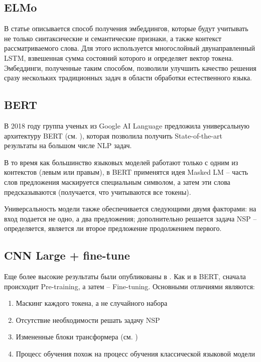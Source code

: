 \documentclass[a4paper,14pt]{extarticle}
\begin{document}
\clearpage

\subsection{ELMo}

В статье \cite{1802.05365} описывается способ получения эмбеддингов, которые будут учитывать не только синтаксические и семантические признаки, а также контекст рассматриваемого слова. Для этого используется многослойный двунаправленный LSTM, взвешенная сумма состояний которого и определяет вектор токена. Эмбеддинги, полученные таким способом, позволили улучшить качество решения сразу нескольких традиционных задач в области обработки естественного языка.


\subsection{BERT}

В 2018 году группа ученых из Google AI Language предложила универсальную архитектуру BERT (см. \cite{1810.04805}), которая позволила получить State-of-the-art результаты на большом числе NLP задач.

В то время как большинство языковых моделей работают только с одним из контекстов (левым или правым), в BERT применятся идея Masked LM -- часть слов предложения маскируется специальным символом, а затем эти слова предсказываются (получается, что учитываются все токены).


Универсальность модели также обеспечивается следующими двумя факторами: на вход подается не одно, а два предложения; дополнительно решается задача NSP -- определяется, является ли второе предложение продолжением первого.


\clearpage

\subsection{CNN Large + fine-tune}

Еще более высокие результаты были опубликованы в \cite{1903.07785}. Как и в BERT, сначала происходит Pre-training, а затем -- Fine-tuning. Основными отличиями являются:
\begin{enumerate}
    \item Маскинг каждого токена, а не случайного набора
    \item Отсутствие необходимости решать задачу NSP
    \item Измененные блоки трансформера (см. \cite{1706.03762})
    \item Процесс обучения похож на процесс обучения классической языковой модели
\end{enumerate}
\end{document}
